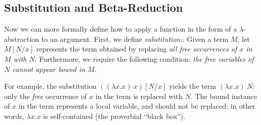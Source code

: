 \subsection*{Substitution and Beta-Reduction}

Now we can more formally define how to apply a function in the form of a $\lambda$-abstraction to
an argument.  First, we define {\em substitution:\/}.  Given a term
$M$, let $M[N/x]$ represents the term obtained by replacing {\em all free
  occurrences of $x$ in $M$ with $N$\/}.  Furthermore, we require the following
condition: {\em the free variables of $N$ cannot appear bound in $M$.\/}

For example, the substitution $((\lambda x.x)~ x) [N/x] $ yields the
term $(\lambda x.x)~ N$: only the {\em free\/} occurrence of $x$ in
the term is replaced with $N$.  The bound instance of $x$ in the term
represents a local variable, and should not be replaced: in other
words, $\lambda x.x$ is self-contained (the proverbial ``black box'').

